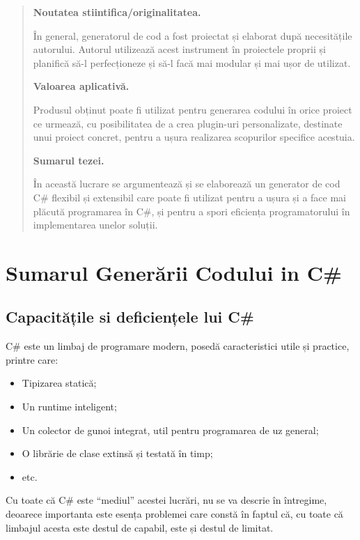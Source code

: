 \documentclass[a4paper,12pt]{report}
\begin{document}
\begin{abstract}
\textbf{Noutatea stiintifica/originalitatea.}

În general, generatorul de cod a fost proiectat și elaborat după necesitățile autorului.
Autorul utilizează acest instrument în proiectele proprii și planifică să-l perfecționeze și să-l facă mai modular și mai ușor de utilizat.

\textbf{Valoarea aplicativă.}

Produsul obținut poate fi utilizat pentru generarea codului în orice proiect ce urmează,
cu posibilitatea de a crea plugin-uri personalizate, destinate unui proiect concret,
pentru a ușura realizarea scopurilor specifice acestuia.

\textbf{Sumarul tezei.}

În această lucrare se argumentează și se elaborează un generator de cod C\# flexibil și extensibil care poate fi utilizat pentru a ușura și a face mai plăcută programarea în C\#, și pentru a spori eficiența programatorului în implementarea unelor soluții.

\end{abstract}

\renewcommand{\thechapter}{\Roman{chapter}}

\chapter{Sumarul Generării Codului in C\#}

\section{Capacitățile si deficiențele lui C\#}

{C\# este un limbaj de programare modern, posedă caracteristici utile și practice}\cite{tour_of_csharp}, printre care:
\begin{itemize}
  \item Tipizarea statică;
  \item Un runtime inteligent;
  \item Un colector de gunoi integrat, util pentru programarea de uz general;
  \item O librărie de clase extinsă și testată în timp;
  \item etc.
\end{itemize}

Cu toate că C\# este ``mediul'' acestei lucrări, nu se va descrie în întregime,
deoarece importanta este esența problemei care constă în faptul că, cu toate că limbajul acesta este destul de capabil, este și destul de limitat.
\end{document}
